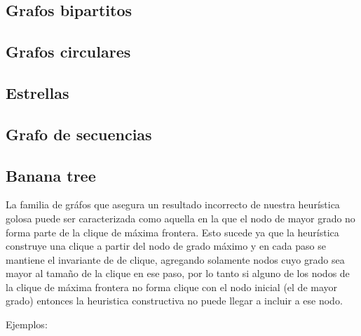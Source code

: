 \subsection{Grafos bipartitos}

\subsection{Grafos circulares}

\subsection{Estrellas}

\subsection{Grafo de secuencias}

\subsection{Banana tree}
	




La familia de gr\'afos que asegura un resultado incorrecto de nuestra 
heur\'istica golosa puede ser caracterizada como aquella en la que el
nodo de mayor grado no forma parte de la clique de m\'axima frontera.
Esto sucede ya que la heur\'istica construye una clique a partir del 
nodo de grado m\'aximo y en cada paso se mantiene el invariante de 
de clique, agregando solamente nodos cuyo grado sea mayor al tama\~no
de la clique en ese paso, por lo tanto si alguno de los nodos de la 
clique de m\'axima frontera no forma clique con el nodo 
inicial (el de mayor grado) entonces la heuristica constructiva no 
puede llegar a incluir a ese nodo.

Ejemplos:

%
%
%
	
